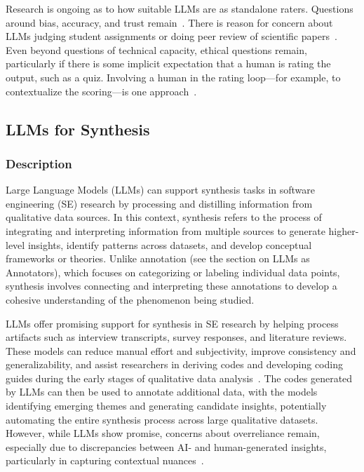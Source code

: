Research is ongoing as to how suitable LLMs are as standalone raters. Questions around bias, accuracy, and trust remain~\cite{DBLP:journals/corr/abs-2406-18403}. There is reason for concern about LLMs judging student assignments or doing peer review of scientific papers~\cite{DBLP:conf/coling/ZhouC024}. Even beyond questions of technical capacity, ethical questions remain, particularly if there is some implicit expectation that a human is rating the output, such as a quiz. Involving a human in the rating loop---for example, to contextualize the scoring---is one approach~\cite{panHumanCenteredDesignRecommendations2024}.


\subsection{LLMs for Synthesis}

\subsubsection{Description}

Large Language Models (LLMs) can support synthesis tasks in software engineering (SE) research by processing and distilling information from qualitative data sources. In this context, synthesis refers to the process of integrating and interpreting information from multiple sources to generate higher-level insights, identify patterns across datasets, and develop conceptual frameworks or theories. Unlike annotation (see the section on LLMs as Annotators), which focuses on categorizing or labeling individual data points, synthesis involves connecting and interpreting these annotations to develop a cohesive understanding of the phenomenon being studied.

LLMs offer promising support for synthesis in SE research by helping process artifacts such as interview transcripts, survey responses, and literature reviews. These models can reduce manual effort and subjectivity, improve consistency and generalizability, and assist researchers in deriving codes and developing coding guides during the early stages of qualitative data analysis~\cite{DBLP:conf/chi/ByunVS23,DBLP:journals/ase/BanoHZT24}. The codes generated by LLMs can then be used to annotate additional data, with the models identifying emerging themes and generating candidate insights, potentially automating the entire synthesis process across large qualitative datasets. However, while LLMs show promise, concerns about overreliance remain, especially due to discrepancies between AI- and human-generated insights, particularly in capturing contextual nuances~\cite{bano2023exploringqualitativeresearchusing}.

